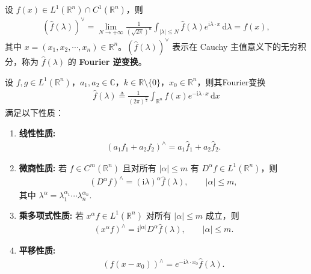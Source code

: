 \documentclass[../../main.tex]{subfiles}
\begin{document}
\begin{theorem}[反演公式]
设 $f(x)\in L^1(\mathbb{R}^n)\cap C^1(\mathbb{R}^n)$，则
\begin{align}
(\hat{f}(\lambda))^\vee=\lim_{N\to+\infty}\frac{1}{(\sqrt{2\pi})^n}\int_{|\lambda|\leqslant N}\hat{f}(\lambda)e^{\mathrm{i}\lambda \cdot x}\,\mathrm{d}\lambda=f(x), \label{eq:fourier-inv-multidim}
\end{align}
其中 $x=(x_1,x_2,\cdots,x_n)\in\mathbb{R}^n$。$(\hat{f}(\lambda))^\vee$ 表示在 Cauchy 主值意义下的无穷积分，称为 $\hat{f}(\lambda)$ 的 \textbf{Fourier 逆变换}。
\end{theorem}

\begin{proposition}\label{proposition:Fourier变换的基本性质2}
设 $f,g\in L^1(\mathbb{R}^n)$，$a_1,a_2\in\mathbb{C}$，$k\in\mathbb{R}\setminus\{0\}$，$x_0\in\mathbb{R}^n$，则其Fourier变换
\begin{align*}
\hat{f}(\lambda)\triangleq \frac{1}{(2\pi)^{\frac{n}{2}}}\int_{\mathbb{R}^n} f(x)e^{-\mathrm{i}\lambda\cdot x}\,\mathrm{d}x
\end{align*}
满足以下性质：
\begin{enumerate}[(1)]
\item \textbf{线性性质:}
\begin{align*}
(a_1f_1+a_2f_2)^\wedge=a_1\hat{f}_1+a_2\hat{f}_2.
\end{align*}

\item\label{proposition:Fourier 变换的基本性质2-2} \textbf{微商性质:} 若 $f\in C^m(\mathbb{R}^n)$ 且对所有 $|\alpha|\leqslant m$ 有 $D^\alpha f\in L^1(\mathbb{R}^n)$，则
\begin{align*}
(D^\alpha f)^\wedge=(\mathrm{i}\lambda)^\alpha \hat{f}(\lambda),\qquad |\alpha|\leqslant m,
\end{align*}
其中 $\lambda^\alpha=\lambda_1^{\alpha_1}\cdots\lambda_n^{\alpha_n}$.

\item \textbf{乘多项式性质:} 若 $x^\alpha f\in L^1(\mathbb{R}^n)$ 对所有 $|\alpha|\leqslant m$ 成立，则
\begin{align*}
(x^\alpha f)^\wedge=\mathrm{i}^{|\alpha|}D^\alpha \hat{f}(\lambda),\qquad |\alpha|\leqslant m.
\end{align*}

\item \textbf{平移性质:}
\begin{align*}
(f(x-x_0))^\wedge=e^{-\mathrm{i}\lambda\cdot x_0}\hat{f}(\lambda).
\end{align*}


\end{enumerate}
\end{proposition}
\end{document}
